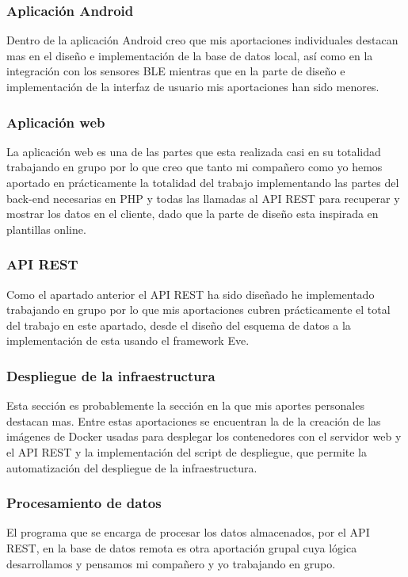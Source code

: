 \documentclass[11pt,spanish]{article}
\begin{document}
\subsubsection{Aplicación Android}

Dentro de la aplicación Android creo que mis aportaciones individuales destacan mas en el diseño e implementación de la base de datos local, así como en la integración con los sensores BLE mientras que en la parte de diseño e implementación de la interfaz de usuario mis aportaciones han sido menores.

\subsubsection{Aplicación web}
La aplicación web es una de las partes que esta realizada casi en su totalidad trabajando en grupo por lo que creo que tanto mi compañero como yo hemos aportado en prácticamente la totalidad del trabajo implementando las partes del back-end necesarias en PHP y todas las llamadas al API REST para recuperar y mostrar los datos en el cliente, dado que la parte de diseño esta inspirada en plantillas online.

\subsubsection{API REST}
Como el apartado anterior el API REST ha sido diseñado he implementado trabajando en grupo por lo que mis aportaciones cubren prácticamente el total del trabajo en este apartado, desde el diseño del esquema de datos a la implementación de esta usando el framework Eve.

\subsubsection{Despliegue de la infraestructura}
Esta sección es probablemente la sección en la que mis aportes personales destacan mas. Entre estas aportaciones se encuentran la de la creación de las imágenes de Docker usadas para desplegar los contenedores con el servidor web y el API REST y la implementación del script de despliegue, que permite la automatización del despliegue de la infraestructura.

\subsubsection{Procesamiento de datos}
El programa que se encarga de procesar los datos almacenados, por el API REST, en la base de datos remota es otra aportación grupal cuya lógica desarrollamos y pensamos mi compañero y yo trabajando en grupo.
\end{document}
